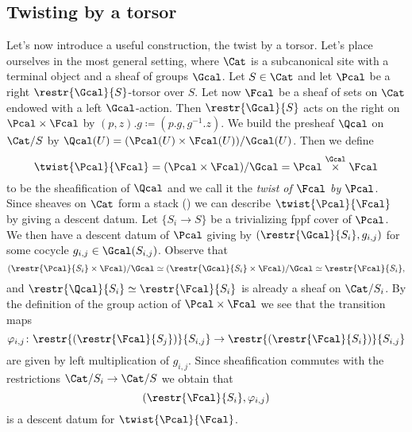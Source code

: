         \subsection{Twisting by a torsor}
            \label{subsect:twist_torsor}
            Let's now introduce a useful construction, the twist by a torsor. Let's place ourselves in the most general setting, where $\Cat$ is a subcanonical site with a terminal object and a sheaf of groups $\Gcal$. Let $S \in \Cat$ and let $\Pcal$ be a right $\restr{\Gcal}{S}$-torsor over $S$. Let now $\Fcal$ be a sheaf of sets on $\Cat$ endowed with a left $\Gcal$-action. Then $\restr{\Gcal}{S}$ acts on the right on $\Pcal \times \Fcal$ by $(p, z).g \coloneqq (p.g, g^{-1}.z)$. We build the presheaf $\Qcal$ on $\Cat/S$ by $\Qcal(U) = (\Pcal(U) \times \Fcal(U))/\Gcal(U)$. Then we define 
            \[\twist{\Pcal}{\Fcal} = (\Pcal \times \Fcal)/\Gcal = \Pcal \stackrel{\Gcal}{\times} \Fcal \] to be the sheafification of $\Qcal$ and we call it the \emph{twist of $\Fcal$ by $\Pcal$}.  Since sheaves on $\Cat$ form a stack (\cite[3.2]{Vist:desc}) we can describe $\twist{\Pcal}{\Fcal}$ by giving a descent datum. Let $\{S_i \to S\}$ be a trivializing fppf cover of $\Pcal$. We then have a descent datum of $\Pcal$ giving by $(\restr{\Gcal}{S_i}, g_{i,j})$ for some cocycle $g_{i,j} \in \Gcal(S_{i,j})$. Observe that \[(\restr{\Pcal}{S_i} \times \Fcal)/\Gcal \simeq (\restr{\Gcal}{S_i} \times \Fcal)/\Gcal \simeq \restr{\Fcal}{S_i}, \] and $\restr{\Qcal}{S_i} \simeq \restr{\Fcal}{S_i}$ is already a sheaf on $\Cat/S_i$. By the definition of the group action of $\Pcal \times \Fcal$ we see that the transition maps \[\varphi_{i,j}\colon \restr{\left(\restr{\Fcal}{S_j}\right)}{S_{i,j}} \to \restr{\left(\restr{\Fcal}{S_i}\right)}{S_{i,j}}\] are given by left multiplication of $g_{i,j}$. Since sheafification commutes with the restrictions $\Cat/S_i \to \Cat/S$ we obtain that \[\left(\restr{\Fcal}{S_i}, \varphi_{i,j}\right) \] is a descent datum for $\twist{\Pcal}{\Fcal}$.  
